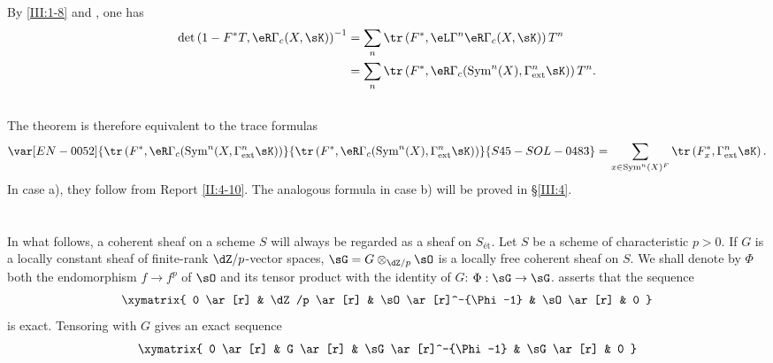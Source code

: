 By \ref{III:1-8} and , one has
\begin{align*}
  \det\left(1-F^* T,\eR\Gamma_c(X,\sK)\right)^{-1}
    &= \sum_n \tr\left(F^*,\eL\Gamma^n\eR\Gamma_c(X,\sK)\right) T^n \\
    &= \sum_n \tr\left(F^*,\eR\Gamma_c(\operatorname{Sym}^n(X),\Gamma_\text{ext}^n\sK)\right) T^n \text{.}
\end{align*}






\subsection{}\label{III:2-13}

The theorem is therefore equivalent to the trace formulas
\[
  \var[EN-0052]{\tr\left(F^*,\eR\Gamma_c(\operatorname{Sym}^n(X,\Gamma_\text{ext}^n \sK)\right)}{\tr\left(F^*,\eR\Gamma_c(\operatorname{Sym}^n(X),\Gamma_\text{ext}^n \sK)\right)}{S45-SOL-0483} = \sum_{x\in\operatorname{Sym}^n(X)^F} \tr\left(F_x^*,\Gamma_\text{ext}^n\sK\right) \text{.}
\]
In case a), they follow from Report \ref{II:4-10}. The analogous formula in
case b) will be proved in \S\ref{III:4}.










\section{}\label{III:3}






\subsection{}\label{III:3-1}

In what follows, a coherent sheaf on a scheme $S$ will always be regarded as
a sheaf on $S_\text{ét}$. Let $S$ be a scheme of characteristic $p>0$. If
$G$ is a locally constant sheaf of finite-rank $\dZ/p$-vector spaces,
$\sG=G\otimes_{\dZ/p}\sO$ is a locally free coherent sheaf on $S$. We shall
denote by $\Phi$ both the endomorphism $f\to f^p$ of $\sO$ and its tensor
product with the identity of $G$: $\Phi:\sG\to\sG$.  asserts that the sequence
\[\xymatrix{
  0 \ar[r]
    & \dZ/p \ar[r]
    & \sO \ar[r]^-{\Phi-1}
    & \sO \ar[r]
    & 0
}\]
is exact. Tensoring with $G$ gives an exact sequence
\[\xymatrix{
  0 \ar[r]
    & G \ar[r]
    & \sG \ar[r]^-{\Phi-1}
    & \sG \ar[r]
    & 0
}\]






